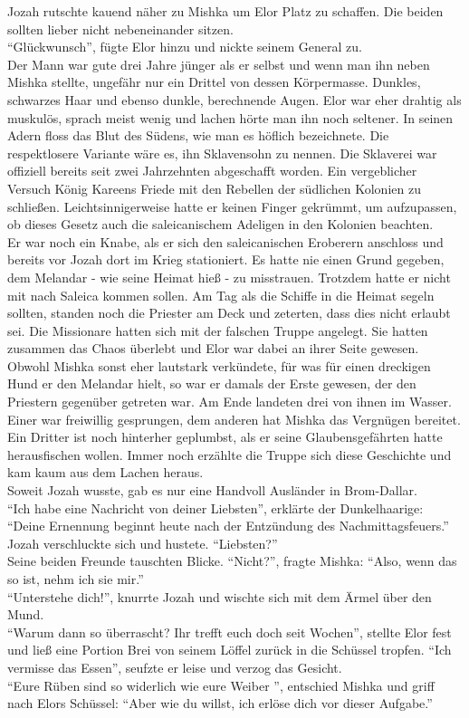 Jozah rutschte kauend näher zu Mishka um Elor Platz zu schaffen. Die beiden sollten lieber nicht 
nebeneinander sitzen.\\
``Glückwunsch'', fügte Elor hinzu und nickte seinem General zu.\\
Der Mann war gute drei Jahre jünger als er selbst und wenn man ihn neben Mishka stellte, ungefähr 
nur ein Drittel von dessen Körpermasse. Dunkles, schwarzes Haar und ebenso dunkle, berechnende 
Augen. Elor war eher drahtig als muskulös, sprach meist wenig und lachen hörte man ihn noch 
seltener. In seinen Adern floss das Blut des Südens, wie man es höflich bezeichnete. Die 
respektlosere Variante wäre es, ihn Sklavensohn zu nennen. Die Sklaverei war offiziell bereits seit 
zwei Jahrzehnten abgeschafft worden. Ein vergeblicher Versuch König Kareens Friede mit den Rebellen 
der südlichen Kolonien zu schließen. Leichtsinnigerweise hatte er keinen Finger gekrümmt, um 
aufzupassen, ob dieses Gesetz auch die saleicanischem Adeligen in den Kolonien beachten.\\
Er war noch ein Knabe, als er sich den saleicanischen Eroberern anschloss und bereits vor Jozah 
dort im Krieg stationiert. Es hatte nie einen Grund gegeben, dem Melandar - wie seine Heimat hieß - 
zu misstrauen. Trotzdem hatte er nicht mit nach Saleica kommen sollen. Am Tag als die Schiffe in 
die Heimat segeln sollten, standen noch die Priester am Deck und zeterten, dass dies nicht erlaubt 
sei. Die Missionare hatten sich mit der falschen Truppe angelegt. Sie hatten zusammen das Chaos 
überlebt und Elor war dabei an ihrer Seite gewesen. Obwohl Mishka sonst eher lautstark verkündete, 
für was für einen dreckigen Hund er den Melandar hielt, so war er damals der Erste gewesen, der den 
Priestern gegenüber getreten war. Am Ende landeten drei von ihnen im Wasser. Einer war freiwillig 
gesprungen, dem anderen hat Mishka das Vergnügen bereitet. Ein Dritter ist noch hinterher 
geplumbst, als er seine Glaubensgefährten hatte herausfischen wollen. Immer noch erzählte die 
Truppe sich diese Geschichte und kam kaum aus dem Lachen heraus.\\
Soweit Jozah wusste, gab es nur eine Handvoll Ausländer in Brom-Dallar.\\
``Ich habe eine Nachricht von deiner Liebsten'', erklärte der Dunkelhaarige: ``Deine Ernennung 
beginnt heute nach der Entzündung des Nachmittagsfeuers.''\\
Jozah verschluckte sich und hustete. ``Liebsten?''\\
Seine beiden Freunde tauschten Blicke. ``Nicht?'', fragte Mishka: ``Also, wenn das so ist, nehm ich 
sie mir.''\\
``Unterstehe dich!'', knurrte Jozah und wischte sich mit dem Ärmel über den Mund.\\
``Warum dann so überrascht? Ihr trefft euch doch seit Wochen'', stellte Elor fest und ließ eine 
Portion Brei von seinem Löffel zurück in die Schüssel tropfen. ``Ich vermisse das Essen'', seufzte 
er leise und verzog das Gesicht.\\
``Eure Rüben sind so widerlich wie eure Weiber '', entschied Mishka und griff nach Elors Schüssel: 
``Aber wie du willst, ich erlöse dich vor dieser Aufgabe.''\\

